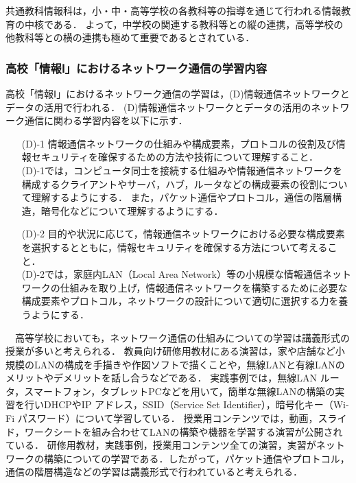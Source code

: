 \documentclass[12pt,a4j,titlepage]{ltjsarticle}
\begin{document}
共通教科情報科は，小・中・高等学校の各教科等の指導を通じて行われる情報教育の中核である．
よって，中学校の関連する教科等との縦の連携，高等学校の他教科等との横の連携も極めて重要であるとされている．
\subsubsection{高校「情報Ⅰ」におけるネットワーク通信の学習内容}
高校「情報Ⅰ」におけるネットワーク通信の学習は，(D)情報通信ネットワークとデータの活用で行われる．
(D)情報通信ネットワークとデータの活用のネットワーク通信に関わる学習内容を以下に示す．
\begin{enumerate}

\item[(D)-1] 情報通信ネットワークの仕組みや構成要素，プロトコルの役割及び情報セキュリティを確保するための方法や技術について理解すること．
\mbox{}\\
(D)-1では，コンピュータ同士を接続する仕組みや情報通信ネットワークを構成するクライアントやサーバ，ハブ，ルータなどの構成要素の役割について理解するようにする．
また，パケット通信やプロトコル，通信の階層構造，暗号化などについて理解するようにする．\\
 
\item[(D)-2] 目的や状況に応じて，情報通信ネットワークにおける必要な構成要素を選択するとともに，情報セキュリティを確保する方法について考えること．
\mbox{}\\
(D)-2では，家庭内LAN（Local Area Network）等の小規模な情報通信ネットワークの仕組みを取り上げ，情報通信ネットワークを構築するために必要な構成要素やプロトコル，ネットワークの設計について適切に選択する力を養うようにする．
\end{enumerate}
　高等学校においても，ネットワーク通信の仕組みについての学習は講義形式の授業が多いと考えられる．
教員向け研修用教材にある演習は\cite{koukou_kensyu}，家や店舗など小規模のLANの構成を手描きや作図ソフトで描くことや，無線LANと有線LANのメリットやデメリットを話し合うなどである．
実践事例では\cite{koukou_jirei}，無線LAN ルータ，スマートフォン，タブレットPCなどを用いて，簡単な無線LANの構築の実習を行いDHCPやIP アドレス，SSID（Service Set Identifier），暗号化キー（Wi-Fi パスワード）について学習している．
授業用コンテンツでは\cite{koukou_kon}，動画，スライド，ワークシートを組み合わせてLANの構築や機器を学習する演習が公開されている．
研修用教材，実践事例，授業用コンテンツ全ての演習，実習がネットワークの構築についての学習である．したがって，パケット通信やプロトコル，通信の階層構造などの学習は講義形式で行われていると考えられる．
\clearpage
\end{document}
